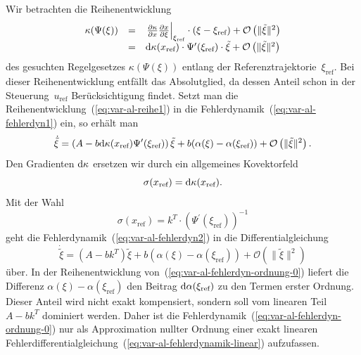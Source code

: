 Wir betrachten die Reihenentwicklung 
\begin{equation}
\begin{array}{lcl}
\kappa(\Psi(\xi)) & = & \left.\frac{\partial\kappa}{\partial x}\frac{\partial x}{\partial\xi}\right|_{\xi_{\text{ref}}}\cdot(\xi-\xi_{\text{ref}})+\mathcal{O}\left(\|\tilde{\xi}\|^{2}\right)\\
 & = & {\mathrm{d}}\kappa(x_{\text{ref}})\cdot\Psi^{\prime}(\xi_{\text{ref}})\cdot\tilde{\xi}+\mathcal{O}\left(\|\tilde{\xi}\|^{2}\right)
\end{array}\label{eq:var-al-reihe1}
\end{equation}
des gesuchten Regelgesetzes $\kappa(\Psi(\xi))$ entlang der Referenztrajektorie~$\xi_{\text{ref}}$.
Bei dieser Reihenentwicklung entfällt das Absolutglied, da dessen
Anteil schon in der Steuerung~$u_{\text{ref}}$ Berücksichtigung
findet. Setzt man die Reihenentwicklung~(\ref{eq:var-al-reihe1})
in die Fehlerdynamik~(\ref{eq:var-al-fehlerdyn1}) ein, so erhält
man 
\begin{equation}
\dot{\tilde{\xi}}=\left(A-b{\mathrm{d}}\kappa(x_{\text{ref}})\Psi^{\prime}(\xi_{\text{ref}})\right)\tilde{\xi}+b(\alpha(\xi)-\alpha(\xi_{\text{ref}}))+\mathcal{O}\left(\|\tilde{\xi}\|^{2}\right).\label{eq:var-al-fehlerdyn2}
\end{equation}
Den Gradienten ${\mathrm{d}}\kappa$ ersetzen wir durch ein allgemeines Kovektorfeld
\begin{equation}
\sigma(x_{\text{ref}})={\mathrm{d}}\kappa(x_{\text{ref}}).\label{eq:var-al-verstaerkung-als-gradient}
\end{equation}
Mit der Wahl 
\begin{equation}
\sigma(x_{\text{ref}})=k^{T}\cdot\left(\Psi^{\prime}(\xi_{\text{ref}})\right)^{-1}\label{eq:var-al-verstaerkung-z}
\end{equation}
geht die Fehlerdynamik~(\ref{eq:var-al-fehlerdyn2}) in die Differentialgleichung
\begin{equation}
\dot{\tilde{\xi}}=\left(A-bk^{T}\right)\tilde{\xi}+b(\alpha(\xi)-\alpha(\xi_{\text{ref}}))+\mathcal{O}\left(\|\tilde{\xi}\|^{2}\right)\label{eq:var-al-fehlerdyn-ordnung-0}
\end{equation}
über. In der Reihenentwicklung von~(\ref{eq:var-al-fehlerdyn-ordnung-0})
liefert die Differenz $\alpha(\xi)-\alpha(\xi_{\text{ref}})$ den
Beitrag ${\mathrm{d}}\alpha(\xi_{\text{ref}})$ zu den Termen erster Ordnung.
Dieser Anteil wird nicht exakt kompensiert, sondern soll vom linearen
Teil $A-bk^{T}$ dominiert werden. Daher ist die Fehlerdynamik~(\ref{eq:var-al-fehlerdyn-ordnung-0})
nur als Approximation nullter Ordnung einer exakt linearen Fehlerdifferentialgleichung~(\ref{eq:var-al-fehlerdynamik-linear})
aufzufassen.

